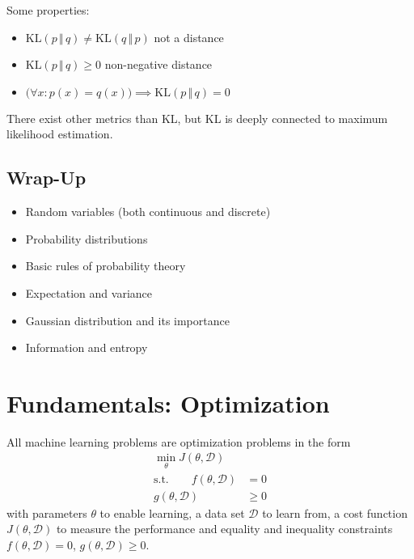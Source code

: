 			Some properties:
			\begin{itemize}
				\item \( \textrm{KL}(p \,\Vert\, q) \neq \textrm{KL}(q \,\Vert\, p) \) not a distance
				\item \( \textrm{KL}(p \,\Vert\, q) \geq 0 \) non-negative distance
				\item \( \big(\forall x : p(x) = q(x)\big) \implies \textrm{KL}(p \,\Vert\, q) = 0 \)
			\end{itemize}

			There exist other metrics than KL, but KL is deeply connected to maximum likelihood estimation. 

	\section{Wrap-Up}
		\begin{itemize}
			\item Random variables (both continuous and discrete)
			\item Probability distributions
			\item Basic rules of probability theory
			\item Expectation and variance
			\item Gaussian distribution and its importance
			\item Information and entropy
		\end{itemize}

\chapter{Fundamentals: Optimization}

	All machine learning problems are optimization problems in the form
	\begin{align}
		\min_\theta J(\theta, \mathcal{D}) &        \\
		\textrm{s.t.} \qquad
		f(\theta, \mathcal{D})             & = 0    \\
		g(\theta, \mathcal{D})             & \geq 0
	\end{align}
	with parameters \(\theta\) to enable learning, a data set \(\mathcal{D}\) to learn from, a cost function \(J(\theta, \mathcal{D})\) to measure the performance and equality and inequality constraints \( f(\theta, \mathcal{D}) = 0 \), \( g(\theta, \mathcal{D}) \geq 0 \).

